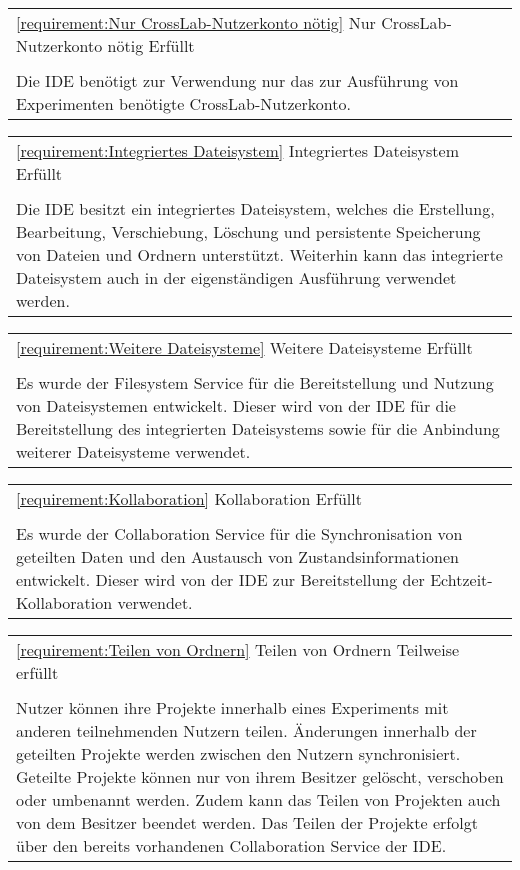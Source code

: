 \vfill
\begin{tabularx}{\textwidth}{X}
    \toprule
    \autoref{requirement:Nur CrossLab-Nutzerkonto nötig} \hfill Nur CrossLab-Nutzerkonto nötig \hfill Erfüllt
    \\
    \\
    Die IDE benötigt zur Verwendung nur das zur Ausführung von Experimenten benötigte CrossLab-Nutzerkonto.
    \\
    \bottomrule
\end{tabularx}
\vfill
\begin{tabularx}{\textwidth}{X}
    \toprule
    \autoref{requirement:Integriertes Dateisystem} \hfill Integriertes Dateisystem \hfill Erfüllt
    \\
    \\
    Die IDE besitzt ein integriertes Dateisystem, welches die Erstellung, Bearbeitung, Verschiebung, Löschung und persistente Speicherung von Dateien und Ordnern unterstützt. Weiterhin kann das integrierte Dateisystem auch in der eigenständigen Ausführung verwendet werden.
    \\
    \bottomrule
\end{tabularx}
\vfill
\begin{tabularx}{\textwidth}{X}
    \toprule
    \autoref{requirement:Weitere Dateisysteme} \hfill Weitere Dateisysteme \hfill Erfüllt
    \\
    \\
    Es wurde der Filesystem Service für die Bereitstellung und Nutzung von Dateisystemen entwickelt. Dieser wird von der IDE für die Bereitstellung des integrierten Dateisystems sowie für die Anbindung weiterer Dateisysteme verwendet.
    \\
    \bottomrule
\end{tabularx}
\vfill
\begin{tabularx}{\textwidth}{X}
    \toprule
    \autoref{requirement:Kollaboration} \hfill Kollaboration \hfill Erfüllt
    \\
    \\
    Es wurde der Collaboration Service für die Synchronisation von geteilten Daten und den Austausch von Zustandsinformationen entwickelt. Dieser wird von der IDE zur Bereitstellung der Echtzeit-Kollaboration verwendet.
    \\
    \bottomrule
\end{tabularx}
\vfill
\begin{tabularx}{\textwidth}{X}
    \toprule
    \autoref{requirement:Teilen von Ordnern} \hfill Teilen von Ordnern \hfill Teilweise erfüllt
    \\
    \\
    Nutzer können ihre Projekte innerhalb eines Experiments mit anderen teilnehmenden Nutzern teilen. Änderungen innerhalb der geteilten Projekte werden zwischen den Nutzern synchronisiert. Geteilte Projekte können nur von ihrem Besitzer gelöscht, verschoben oder umbenannt werden. Zudem kann das Teilen von Projekten auch von dem Besitzer beendet werden. Das Teilen der Projekte erfolgt über den bereits vorhandenen Collaboration Service der IDE.
    \\
    \bottomrule
\end{tabularx}
